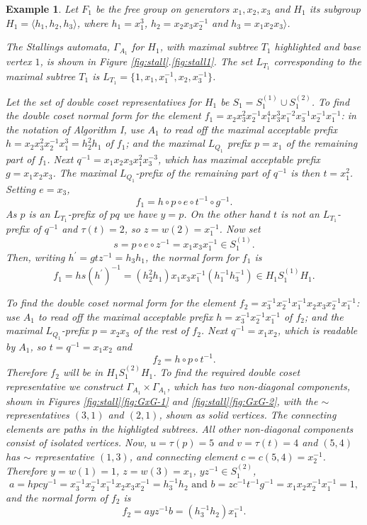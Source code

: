 \documentclass[a4paper,12pt]{article}
\newcommand{\G}{\Gamma }
\renewcommand{\t}{\tau }
\newtheorem{exam}[theorem]{Example}
\newenvironment{example}{\begin{exam} \rm}{\end{exam}}
\numberwithin{equation}{section}
\numberwithin{figure}{section}
\newcommand{\la}{\langle}
\newcommand{\ra}{\rangle}
\begin{document}
\begin{example}\label{ex:f_1}
Let $F_1$ be the free group on generators $x_1,x_2,x_3$ and $H_1$ its
subgroup $H_1=\la
h_1,h_2,h_3\ra$, where  $h_1= x_1^3$, $h_2=x_2x_3x_2^{-1}$ and 
$h_3=x_1x_2x_3\ra$.

The Stallings automata, $\G_{A_1}$ for $H_1$,  
with maximal subtree $T_1$ highlighted and base vertex $1$, is shown
in Figure \ref{fig:stall}.\ref{fig:stall1}. 
The set $L_{T_1}$ corresponding to the maximal subtree  $T_1$ is
 $L_{T_1}=\{1,x_1,x_1^{-1},x_2,x_3^{-1} \}$. 

Let the set of double coset representatives for $H_1$ be $S_1=S_1^{(1)}
\cup S_1^{(2)}$. 
To find the double coset normal form for the element $f_1 =
x_2x_3^2x_2^{-1} x_1^4x_3^3x_1^{-2}x_3^{-1}x_2^{-1}x_1^{-1}$: in  
the notation of Algorithm I, use  
${A_1}$ to read off the maximal acceptable prefix $h=x_2x_3^2x_2^{-1} x_1^3
=h_2^2h_1$ 
of $f_1$; and
the maximal $L_{Q_1}$ prefix $p=x_1$ of the remaining part of $f_1$. Next  
$q^{-1}=x_1x_2x_3x_1^2x_3^{-3}$, which has maximal acceptable prefix 
$g=x_1x_2x_3$. The maximal $L_{Q_1}$-prefix of the remaining part of $q^{-1}$
is then $t=x_1^2$. Setting $e=x_3$,
\[f_1=h\circ p\circ e\circ t^{-1}\circ g^{-1}.\]
As $p$ is an $L_{T_1}$-prefix of $pq$ we have $y=p$. On the other hand 
$t$ is not an $L_{T_1}$-prefix of $q^{-1}$ and $\t(t)=2$, so $z=w(2)=x_1^{-1}$. 
Now set 
\[s=p\circ e\circ z^{-1}=x_1x_3x_1^{-1}\in S_1^{(1)}.\]
Then, writing $h^\prime=gtz^{-1}=h_3h_1$, the normal form for $f_1$ is 
\[f_1=hs(h^\prime)^{-1}=(h_2^{2}h_1) x_1x_3x_1^{-1} (h_1^{-1}h_3^{-1})\in H_1S_1^{(1)}H_1.\] 

To find the double coset normal form for the element 
$f_2=x_3^{-1}x_2^{-1}x_1^{-1}x_2x_3x_2^{-1}x_1^{-1}$: use  
${A_1}$ to read off the maximal acceptable prefix $h=x_3^{-1}x_2^{-1}x_1^{-1}$ 
of $f_2$;
and  the maximal $L_{Q_1}$-prefix $p=x_2x_3$ of the rest of $f_2$.  Next  
$q^{-1}=x_1x_2$, which is readable by ${A_1}$, so  $t=q^{-1}=x_1x_2$ and 
\[f_2=h\circ p\circ t^{-1}.\] 
Therefore $f_2$ will be in $H_1S_1^{(2)}H_1$. To find the required double
coset representative we construct $\G_{A_1}\times \G_{A_1}$, which has 
two non-diagonal components, shown in Figures 
\ref{fig:stall}\ref{fig:GxG-1} and \ref{fig:stall}\ref{fig:GxG-2}, with
the $\sim$ representatives $(3,1)$ and $(2,1)$,  shown as solid vertices. The connecting
elements are paths in the highligted subtrees.  All other non-diagonal
components consist of isolated vertices. 
Now, $u=\t(p)=5$ and $v=\t(t)=4$ and $(5,4)$ has $\sim$ representative 
$(1,3)$, and connecting element $c=c(5,4)=x_2^{-1}$. Therefore 
$y=w(1)=1$, $z=w(3)=x_1$, $yz^{-1}\in S_1^{(2)}$, 
\[a=hpcy^{-1}=x_3^{-1}x_2^{-1}x_1^{-1}x_2x_3x_2^{-1}=h_3^{-1}h_2 
\textrm{ and } b=zc^{-1}t^{-1}g^{-1}=x_1 x_2 x_2^{-1} x_1^{-1}=1,\]
and the normal form of $f_2$ is 
\[f_2=a yz^{-1} b=(h_3^{-1}h_2) x_1^{-1}.\]
\end{example}
\end{document}
